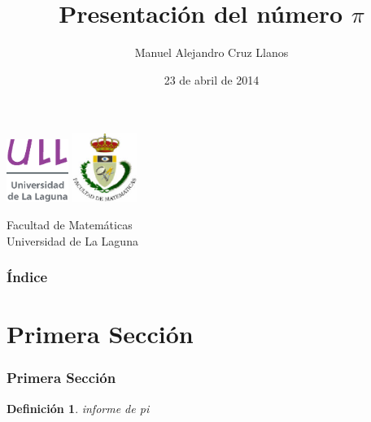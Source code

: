 \documentclass{beamer}
\title[Presentación con Beamer del número $\pi$]{Presentación del número $\pi$}
\author[Manuel Alejandro Cruz Llanos]{Manuel Alejandro Cruz Llanos}
\date[23-04-2014]{23 de abril de 2014}
\newtheorem{definicion}{Definición}
\begin{document}
  
\begin{frame}

  \includegraphics[width=0.15\textwidth]{img/ullesc}
  \hspace*{7.0cm}
  \includegraphics[width=0.16\textwidth]{img/fmatesc}
  \titlepage

  \begin{small}
    \begin{center}
     Facultad de Matemáticas \\
     Universidad de La Laguna
    \end{center}
  \end{small}

\end{frame}

\begin{frame}
  \frametitle{Índice}
  \tableofcontents[pausesections]
\end{frame}


\section{Primera Sección}


\begin{frame}

\frametitle{Primera Sección}

\begin{definicion}

informe de pi

\end{definicion}

\end{frame}
\end{document}
